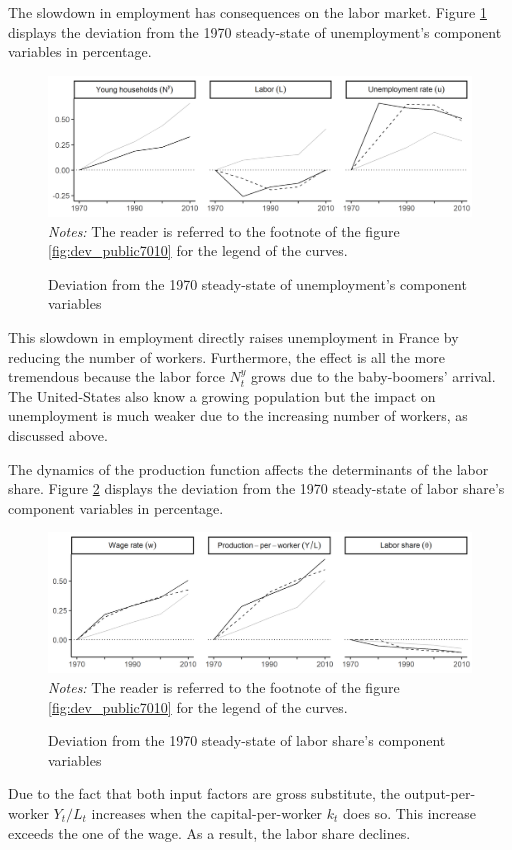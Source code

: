The slowdown in employment has consequences on the labor market. Figure \ref{fig:dev_unemp7010} displays the deviation from the 1970 steady-state of unemployment's component variables in percentage.
\begin{figure}[tb]
	\centering	
	\caption{Deviation from the 1970 steady-state of unemployment's component variables} \label{fig:dev_unemp7010}
	\includegraphics[width=1\linewidth]{../result/deviation/dev_unemp7010.png}
	\vspace{-6ex}
	\justify\singlespacing\footnotesize \textit{Notes:} The reader is referred to the footnote of the figure \ref{fig:dev_public7010} for the legend of the curves.
\end{figure}
This slowdown in employment directly raises unemployment in France by reducing the number of workers. Furthermore, the effect is all the more tremendous because the labor force $N_t^y$ grows due to the baby-boomers' arrival. The United-States also know a growing population but the impact on unemployment is much weaker due to the increasing number of workers, as discussed above.

The dynamics of the production function affects the determinants of the labor share. Figure \ref{fig:dev_laborshare7010} displays the deviation from the 1970 steady-state of labor share's component variables in percentage.
\begin{figure}[tb]
	\centering
	\caption{Deviation from the 1970 steady-state of labor share's component variables} \label{fig:dev_laborshare7010}
	\includegraphics[width=1\linewidth]{../result/deviation/dev_laborshare7010.png}
	\vspace{-6ex}
	\justify\singlespacing\footnotesize \textit{Notes:} The reader is referred to the footnote of the figure \ref{fig:dev_public7010} for the legend of the curves.
\end{figure}
Due to the fact that both input factors are gross substitute, the output-per-worker $Y_t/L_t$ increases when the capital-per-worker $k_t$ does so. This increase exceeds the one of the wage. As a result, the labor share declines.

